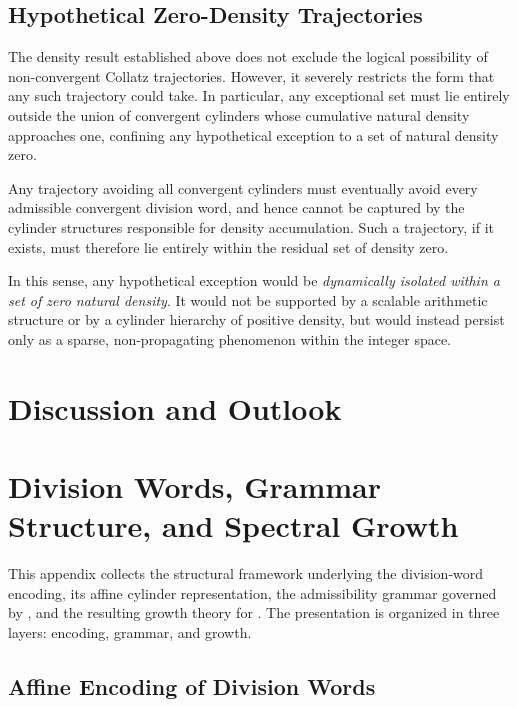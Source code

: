\documentclass[12pt, oneside]{article}
\numberwithin{equation}{section}
\theoremstyle{definition}
\theoremstyle{plain}
\theoremstyle{remark}
\begin{document}
\subsection{Hypothetical Zero-Density Trajectories}

The density result established above does not exclude the logical possibility of
non-convergent Collatz trajectories. However, it severely restricts the form that
any such trajectory could take. In particular, any exceptional set must lie entirely
outside the union of convergent cylinders whose cumulative natural density
approaches one, confining any hypothetical exception to a set of natural density zero.

Any trajectory avoiding all convergent cylinders must eventually avoid every
admissible convergent division word, and hence cannot be captured by the cylinder
structures responsible for density accumulation. Such a trajectory, if it exists,
must therefore lie entirely within the residual set of density zero.

In this sense, any hypothetical exception would be \emph{dynamically isolated within
a set of zero natural density}.  It would not be supported by a scalable arithmetic
structure or by a cylinder hierarchy of positive density, but would instead persist
only as a sparse, non-propagating phenomenon within the integer space.

\section{Discussion and Outlook}


\appendix
\section{Division Words, Grammar Structure, and Spectral Growth}
\label{app:spine}

This appendix collects the structural framework underlying the division-word encoding,
its affine cylinder representation, the admissibility grammar governed by ,
and the resulting growth theory for . The presentation is organized in three layers:
encoding, grammar, and growth.

\subsection{Affine Encoding of Division Words}
\label{app:spine-affine}
\end{document}
